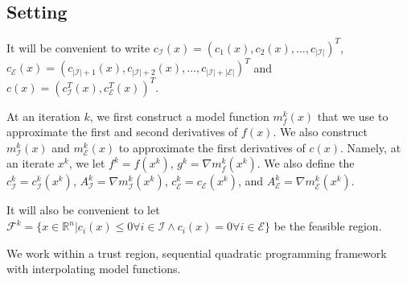 \documentclass{article}
\begin{document}

\subsection{Setting}



It will be convenient to write
$c_{\mathcal {I}}(x) = (c_1(x), c_2(x), \ldots, c_{|\mathcal{I}|})^T$,
$c_{\mathcal {E}}(x) = (c_{|\mathcal{I}|+1}(x), c_{|\mathcal{I}|+2}(x), \ldots, c_{|\mathcal{I}| + |\mathcal{E}|})^T$ and
$c(x) = (c_{\mathcal{I}}^T(x), c_{\mathcal{E}}^T(x))^T$.


At an iteration $k$, we first construct a model function $m_f^k(x)$ that we use to approximate the first and second derivatives of $f(x)$.
We also construct $m_{\mathcal{I}}^k(x)$ and $m_{\mathcal{E}}^k(x)$ to approximate the first derivatives of $c(x)$.
Namely, at an iterate $x^k$, we let $f^k = f(x^k)$, $g^k = \nabla m_f^k(x^k)$. %
We also define the $c_{{\mathcal{I}}}^k = c^k_{\mathcal{I}}(x^k)$, 
$A_{{\mathcal{I}}}^k = \nabla m_{\mathcal{I}}^k(x^k)$,
$c_{{\mathcal{E}}}^k = c_{\mathcal{E}}(x^k)$, and
$A_{{\mathcal{E}}}^k = \nabla m_{\mathcal{E}}^k(x^k)$.

It will also be convenient to let $\mathcal{F}^k = \{ x \in \mathbb R^n | c_i(x) \le 0 \forall i \in \mathcal{I} \wedge c_i(x) = 0 \forall i \in \mathcal{E}\}$ be the feasible region.

We work within a trust region, sequential quadratic programming framework with interpolating model functions.
\end{document}

